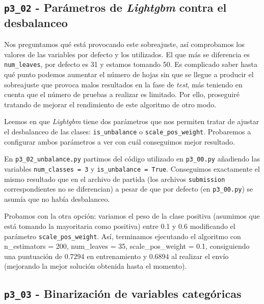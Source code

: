 \documentclass[a4paper, 20pt]{article}
\begin{document}
\subsection{\texttt{p3\_02} - Parámetros de \textit{Lightgbm} contra el desbalanceo}

Nos preguntamos qué está provocando este sobreajuste, así comprobamos los valores de las variables por defecto y los utilizados. El que más se diferencia es \texttt{num\_leaves}, por defecto es 31 y estamos tomando 50. Es complicado saber hasta qué punto podemos aumentar el número de hojas sin que se llegue a producir el sobreajuste que provoca malos resultados en la fase de \textit{test}, más teniendo en cuenta que el número de pruebas a realizar es limitado. Por ello, proseguiré tratando de mejorar el rendimiento de este algoritmo de otro modo.

Leemos en \cite{noauthor_parameters_nodate} que \textit{Lightgbm} tiene dos parámetros que nos permiten tratar de ajustar el desbalanceo de las clases: \texttt{is\_unbalance} o \texttt{scale\_pos\_weight}.
Probaremos a configurar ambos parámetros a ver con cuál conseguimos mejor resultado.

En \texttt{p3\_02\_unbalance.py} partimos del código utilizado en \texttt{p3\_00.py} añadiendo las variables \texttt{num\_classes = 3} y \texttt{is\_unbalance = True}. Conseguimos exactamente el mismo resultado que en el archivo de partida (los archivos \texttt{submission} correspondientes no se diferencian) a pesar de que por defecto (en \texttt{p3\_00.py}) se asumía que no había desbalanceo. 

Probamos con la otra opción: variamos el peso de la clase positiva (asumimos que está tomando la mayoritaria como positiva) entre 0.1 y 0.6 modificando el parámetro \texttt{scale\_pos\_weight}.
Así, terminamos ejecutando el algoritmo con {\ttfamily n\_estimators = 200, num\_leaves = 35, scale\_pos\_weight = 0.1}, consiguiendo una puntuación de 0.7294 en entrenamiento y 0.6894 al realizar el envío (mejorando la mejor solución obtenida hasta el momento).

\subsection{\texttt{p3\_03} -  Binarización de variables categóricas}
\end{document}
